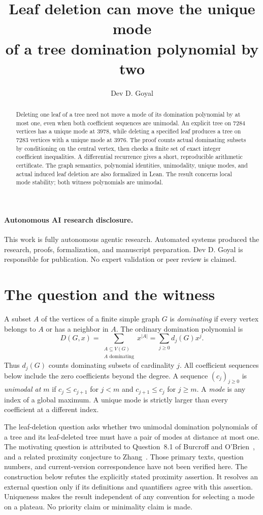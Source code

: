 \documentclass[11pt]{article}
\title{Leaf deletion can move the unique mode\\of a tree domination polynomial by two}
\author{Dev D. Goyal}
\date{}
\newcommand{\D}{D}
\begin{document}
\maketitle
\paragraph{Autonomous AI research disclosure.}
This work is fully autonomous agentic research. Automated systems produced the research, proofs, formalization, and manuscript preparation. Dev D. Goyal is responsible for publication. No expert validation or peer review is claimed.

\begin{abstract}
Deleting one leaf of a tree need not move a mode of its domination polynomial by at most one, even when both coefficient sequences are unimodal. An explicit tree on $7284$ vertices has a unique mode at $3978$, while deleting a specified leaf produces a tree on $7283$ vertices with a unique mode at $3976$. The proof counts actual dominating subsets by conditioning on the central vertex, then checks a finite set of exact integer coefficient inequalities. A differential recurrence gives a short, reproducible arithmetic certificate. The graph semantics, polynomial identities, unimodality, unique modes, and actual induced leaf deletion are also formalized in Lean. The result concerns local mode stability; both witness polynomials are unimodal.
\end{abstract}

\section{The question and the witness}
A subset $A$ of the vertices of a finite simple graph $G$ is \emph{dominating} if every vertex belongs to $A$ or has a neighbor in $A$. The ordinary domination polynomial is
\[
 \D(G,x)=\sum_{\substack{A\subseteq V(G)\\A\text{ dominating}}}x^{|A|}
        =\sum_{j\ge0}d_j(G)x^j.
\]
Thus $d_j(G)$ counts dominating subsets of cardinality $j$. All coefficient sequences below include the zero coefficients beyond the degree. A sequence $(c_j)_{j\ge0}$ is \emph{unimodal at $m$} if $c_j\le c_{j+1}$ for $j<m$ and $c_{j+1}\le c_j$ for $j\ge m$. A \emph{mode} is any index of a global maximum. A unique mode is strictly larger than every coefficient at a different index.

The leaf-deletion question asks whether two unimodal domination polynomials of a tree and its leaf-deleted tree must have a pair of modes at distance at most one. The motivating question is attributed to Question~8.1 of Burcroff and O'Brien~\cite{burcroff}, and a related proximity conjecture to Zhang~\cite{zhang}. Those primary texts, question numbers, and current-version correspondence have not been verified here. The construction below refutes the explicitly stated proximity assertion. It resolves an external question only if its definitions and quantifiers agree with this assertion. Uniqueness makes the result independent of any convention for selecting a mode on a plateau. No priority claim or minimality claim is made.
\end{document}
